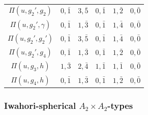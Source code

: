 \begin{landscape}
\begin{table}[h]
\begin{minipage}{0.40\textwidth}
\begin{tabular}{|c|ccccc|}
                $\Pi(u,g_2',g_2)$ & $0,\bar1$ & $3,\bar{5}$ & $0,\bar1$ & $1,\bar2$ & $0,\bar0$ \\
                $\Pi(u,g_2',\gamma)$ & $0,\bar1$ & $1,\bar{3}$ & $0,\bar1$ & $1,\bar4$ & $0,\bar0$ \\
                $\Pi(u,g_2',g_2')$ & $0,\bar1$ & $3,\bar{5}$ & $0,\bar1$ & $1,\bar4$ & $0,\bar0$ \\
                $\Pi(u,g_2',g_4)$ & $0,\bar1$ & $1,\bar{3}$ & $0,\bar1$ & $1,\bar2$ & $0,\bar0$ \\\hline
                $\Pi(u,g_3,h)$ & $1,\bar{3}$ & $2,\bar{4}$ & $1,\bar1$ & $1,\bar1$ & $0,\bar0$ \\\hline
                $\Pi(u,g_4,h)$ & $0,\bar1$ & $1,\bar{3}$ & $0,\bar1$ & $1,\bar2$ & $0,\bar0$ \\\hline
            \end{tabular}
            \caption{}
        \end{minipage}
    \end{table}

    \newpage
    \centering
    \subsubsection*{Iwahori-spherical \texorpdfstring{$A_2\times A_2$}{PDFstring}-types}

    \begin{table}[!ht]
        \centering
        

\end{table}
\end{landscape}
